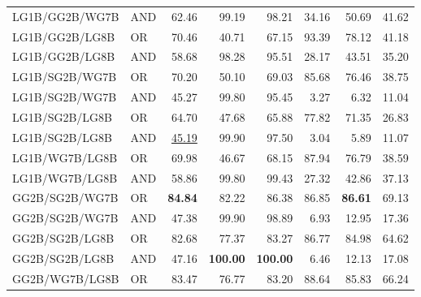 \documentclass{article}
\begin{document}
{\begin{longtable}{llrrrrrr}
 LG1B/GG2B/WG7B           & AND     & 62.46             & 99.19             & 98.21             & 34.16            & 50.69            & 41.62            \\
 LG1B/GG2B/LG8B           & OR      & 70.46             & 40.71             & 67.15             & 93.39            & 78.12            & 41.18            \\
 LG1B/GG2B/LG8B           & AND     & 58.68             & 98.28             & 95.51             & 28.17            & 43.51            & 35.20            \\
 LG1B/SG2B/WG7B           & OR      & 70.20             & 50.10             & 69.03             & 85.68            & 76.46            & 38.75            \\
 LG1B/SG2B/WG7B           & AND     & 45.27             & 99.80             & 95.45             & 3.27             & 6.32             & 11.04            \\
 LG1B/SG2B/LG8B           & OR      & 64.70             & 47.68             & 65.88             & 77.82            & 71.35            & 26.83            \\
 LG1B/SG2B/LG8B           & AND     & \underline{45.19} & 99.90             & 97.50             & 3.04             & 5.89             & 11.07            \\
 LG1B/WG7B/LG8B           & OR      & 69.98             & 46.67             & 68.15             & 87.94            & 76.79            & 38.59            \\
 LG1B/WG7B/LG8B           & AND     & 58.86             & 99.80             & 99.43             & 27.32            & 42.86            & 37.13            \\
 GG2B/SG2B/WG7B           & OR      & \textbf{84.84}    & 82.22             & 86.38             & 86.85            & \textbf{86.61}   & 69.13            \\
 GG2B/SG2B/WG7B           & AND     & 47.38             & 99.90             & 98.89             & 6.93             & 12.95            & 17.36            \\
 GG2B/SG2B/LG8B           & OR      & 82.68             & 77.37             & 83.27             & 86.77            & 84.98            & 64.62            \\
 GG2B/SG2B/LG8B           & AND     & 47.16             & \textbf{100.00}   & \textbf{100.00}   & 6.46             & 12.13            & 17.08            \\
 GG2B/WG7B/LG8B           & OR      & 83.47             & 76.77             & 83.20             & 88.64            & 85.83            & 66.24            \\

\end{longtable}}
\end{document}
